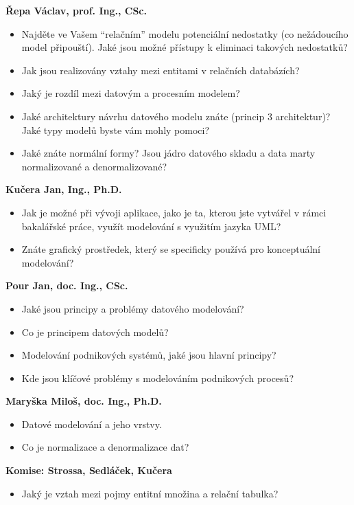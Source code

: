 \documentclass[12pt,a4paper]{article}
\begin{document}
\begin{profesorbox}
\textbf{Řepa Václav, prof. Ing., CSc.}
\begin{itemize}
  \item Najděte ve Vašem ``relačním'' modelu potenciální nedostatky (co nežádoucího model připouští).
    Jaké jsou možné přístupy k eliminaci takových nedostatků?
  \item Jak jsou realizovány vztahy mezi entitami v relačních databázích?
  \item Jaký je rozdíl mezi datovým a procesním modelem?
  \item Jaké architektury návrhu datového modelu znáte (princip 3 architektur)? Jaké typy modelů
    byste vám mohly pomoci?
  \item Jaké znáte normální formy? Jsou jádro datového skladu a data marty normalizované
    a denormalizované?
\end{itemize}

\textbf{Kučera Jan, Ing., Ph.D.}
\begin{itemize}
  \item Jak je možné při vývoji aplikace, jako je ta, kterou jste vytvářel v rámci bakalářské práce,
    využít modelování s využitím jazyka UML?
  \item Znáte grafický prostředek, který se specificky používá pro konceptuální modelování?
\end{itemize}

\textbf{Pour Jan, doc. Ing., CSc.}
\begin{itemize}
  \item Jaké jsou principy a problémy datového modelování?
  \item Co je principem datových modelů?
  \item Modelování podnikových systémů, jaké jsou hlavní principy?
  \item Kde jsou klíčové problémy s modelováním podnikových procesů?
\end{itemize}

\textbf{Maryška Miloš, doc. Ing., Ph.D.}
\begin{itemize}
  \item Datové modelování a jeho vrstvy.
  \item Co je normalizace a denormalizace dat?
\end{itemize}

\textbf{Komise: Strossa, Sedláček, Kučera}
\begin{itemize}
  \item Jaký je vztah mezi pojmy entitní množina a relační tabulka?
\end{itemize}
\end{profesorbox}
\end{document}
